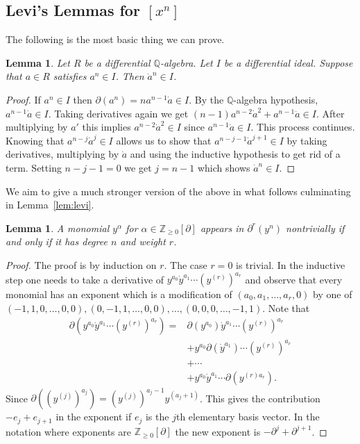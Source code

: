 \documentclass[12pt]{book}
\numberwithin{equation}{section}
\newtheorem{lemma}[theorem]{Lemma}
\theoremstyle{definition}
\theoremstyle{remark}
\newcommand{\ZZ}{\mathbb{Z}}
\newcommand{\QQ}{\mathbb{Q}}
\begin{document}
\subsection{Levi's Lemmas for $[x^n]$}
The following is the most basic thing we can prove. 
\begin{lemma}\label{lem:power-lemma}
	Let $R$ be a differential $\QQ$-algebra. 
	Let $I$ be a differential ideal. 
	Suppose that $a\in R$ satisfies $a^n \in I$. 
	Then $\dot{a}^{n} \in I$. 
\end{lemma}
\begin{proof}
	If $a^n \in I$ then $\partial(a^n) = n a^{n-1} \dot{a}\in I$. 
	By the $\QQ$-algebra hypothesis, $a^{n-1}\dot{a}\in I$. 
	Taking derivatives again we get $(n-1)a^{n-2}\dot{a}^2 + a^{n-1}\ddot{a}\in I.$
	After multiplying by $a'$ this implies $a^{n-2} \dot{a}^2 \in I$ since $a^{n-1}\dot{a} \in I$.
	This process continues. 
	Knowing that $a^{n-j}\dot{a}^j \in I$ allows us to show that $a^{n-j-1}\dot{a}^{j+1} \in I$ by taking derivatives, multiplying by $\dot{a}$ and using the inductive hypothesis to get rid of a term. 
	Setting $n-j-1=0$ we get $j=n-1$ which shows $\dot{a}^n \in I$.
\end{proof}

We aim to give a much stronger version of the above in what follows culminating in Lemma~\ref{lem:levi}.
\begin{lemma}\label{lem:monomials-of-derivative}
	A monomial $y^{\alpha}$ for $\alpha \in \ZZ_{\geq 0}[\partial]$ appears in $\partial^r(y^n)$ nontrivially if and only if it has degree $n$ and weight $r$.
\end{lemma}
\begin{proof}
	The proof is by induction on $r$.
	The case $r=0$ is trivial.
	In the inductive step one needs to take a derivative of $y^{a_0} \dot{y}^{a_1}\cdots (y^{(r)})^{a_r}$ and observe that every monomial has an exponent which is a modification of $(a_0, a_1,\ldots, a_r,0)$ by one of  $(-1,1,0,\ldots, 0,0), (0,-1,1,\ldots, 0,0), \ldots, (0,0,0, \ldots, -1,1)$.
	Note that 
	\begin{align*}
	\partial(y^{a_0} \dot{y}^{a_1}\cdots (y^{(r)})^{a_r}) =& \partial(y^{a_0}) \dot{y}^{a_1}\cdots (y^{(r)})^{a_r} \\
	&+ y^{a_0} \partial(\dot{y}^{a_1})\cdots (y^{(r)})^{a_r} \\
	&+ \cdots \\
	&+ y^{a_0} \dot{y}^{a_1}\cdots \partial(y^{(r)a_r}).
	\end{align*}
	Since  $\partial((y^{(j)})^{a_j})=(y^{(j)})^{a_j-1}y^{(a_j+1)}$.
	This gives the contribution $-e_j+e_{j+1}$ in the exponent if $e_j$ is the $j$th elementary basis vector. 
	In the notation where exponents are $\ZZ_{\geq 0}[\partial]$ the new exponent is $-\partial^j + \partial^{j+1}$.
\end{proof}
\end{document}
